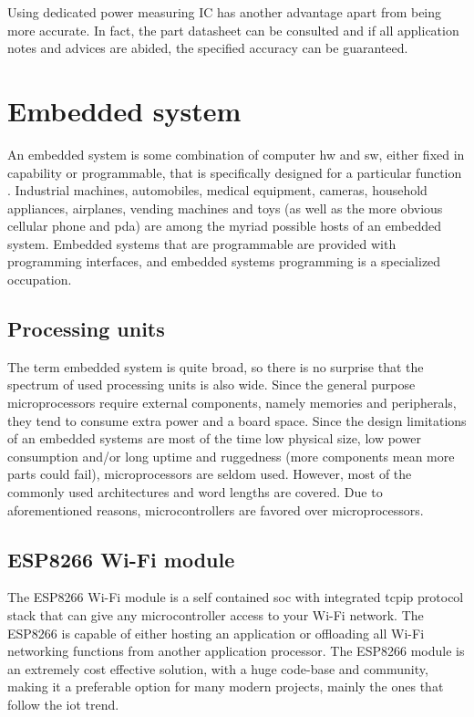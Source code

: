 \documentclass[journal]{IEEEtran}
\begin{document}
Using dedicated power measuring IC has another advantage apart from being more accurate. In fact, the part \gls{datasheet} can be consulted and if all application notes and advices are abided, the specified accuracy can be guaranteed.



\section{Embedded system}
An embedded \gls{system} is some combination of \gls{computer} \gls{hw} and \gls{sw}, either fixed in capability or programmable, that is specifically designed for a particular function \cite{ganssle2008embedded}. Industrial machines, automobiles, medical equipment, cameras, household appliances, airplanes, vending machines and toys (as well as the more obvious cellular phone and \gls{pda}) are among the myriad possible hosts of an embedded \gls{system}. Embedded \glspl{system} that are programmable are provided with programming \glspl{interface}, and embedded \glspl{system} programming is a specialized occupation.

\subsection{Processing units}
The term embedded \gls{system} is quite broad, so there is no surprise that the spectrum of used processing units is also wide. Since the general purpose microprocessors require external components, namely memories and \glspl{peripheral}, they tend to consume extra power and a board space. Since the design limitations of an embedded \glspl{system} are most of the time low physical size, low power consumption and/or long uptime and ruggedness (more components mean more parts could fail), microprocessors are seldom used. However, most of the commonly used architectures and word lengths are covered. Due to aforementioned reasons, microcontrollers are favored over microprocessors. 

\subsection{ESP8266 Wi-Fi module} \label{s:esp8266}
The ESP8266 Wi-Fi module is a self contained \gls{soc} with integrated \gls{tcpip} protocol stack that can give any microcontroller access to your Wi-Fi network. The ESP8266 is capable of either hosting an application or offloading all Wi-Fi networking functions from another application processor. The ESP8266 module is an extremely cost effective solution, with a huge code-base and community, making it a preferable option for many modern projects, mainly the ones that follow the \gls{iot} trend.
\end{document}
